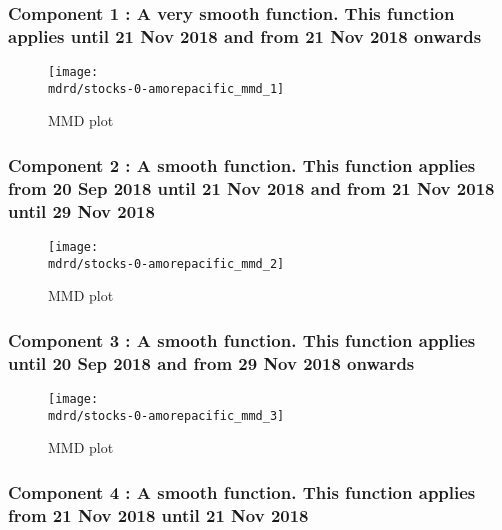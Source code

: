\documentclass{article} %
\begin{document}
\subsubsection{Component 1 : A very smooth function. This function applies until 21 Nov 2018 and from 21 Nov 2018 onwards}

\begin{figure}[H]
\newcommand{\wmgd}{0.5\columnwidth}
\newcommand{\hmgd}{3.0cm}
\newcommand{\mdrd}{stocks-0-amorepacific}
\newcommand{\mbm}{\hspace{-0.3cm}}
\texttt{[image: \\mdrd/stocks-0-amorepacific\_mmd\_1]}
\caption{
MMD plot}
\label{fig:mmd1}
\end{figure}

\subsubsection{Component 2 : A smooth function. This function applies from 20 Sep 2018 until 21 Nov 2018 and from 21 Nov 2018 until 29 Nov 2018}

\begin{figure}[H]
\newcommand{\wmgd}{0.5\columnwidth}
\newcommand{\hmgd}{3.0cm}
\newcommand{\mdrd}{stocks-0-amorepacific}
\newcommand{\mbm}{\hspace{-0.3cm}}
\texttt{[image: \\mdrd/stocks-0-amorepacific\_mmd\_2]}
\caption{
MMD plot}
\label{fig:mmd2}
\end{figure}

\subsubsection{Component 3 : A smooth function. This function applies until 20 Sep 2018 and from 29 Nov 2018 onwards}

\begin{figure}[H]
\newcommand{\wmgd}{0.5\columnwidth}
\newcommand{\hmgd}{3.0cm}
\newcommand{\mdrd}{stocks-0-amorepacific}
\newcommand{\mbm}{\hspace{-0.3cm}}
\texttt{[image: \\mdrd/stocks-0-amorepacific\_mmd\_3]}
\caption{
MMD plot}
\label{fig:mmd3}
\end{figure}

\subsubsection{Component 4 : A smooth function. This function applies from 21 Nov 2018 until 21 Nov 2018}
\end{document}

